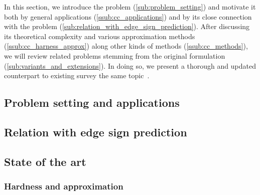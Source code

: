 
In this section, we introduce the \pcc{} problem (\autoref{sub:problem_setting}) and motivate it
both by general applications (\autoref{ssub:cc_applications}) and by its close connection with the
\esp{} problem (\autoref{sub:relation_with_edge_sign_prediction}). After discussing its theoretical
complexity and various approximation methods (\autoref{ssub:cc_harness_approx}) along other kinds of
methods (\autoref{ssub:cc_methods}), we will review related problems stemming from the original
formulation (\autoref{sub:variants_and_extensions}). In doing so, we present a thorough and updated
counterpart to existing survey the same
topic~\autocites{bonchi2014correlation}{surveyCC16}{CCWirth2017}.

\subsection{Problem setting and applications}
\label{sub:problem_setting}


\subsection{Relation with edge sign prediction}
\label{sub:relation_with_edge_sign_prediction}


\subsection{State of the art}
\label{sub:state_of_the_art}

\subsubsection{Hardness and approximation}
\label{ssub:cc_harness_approx}

